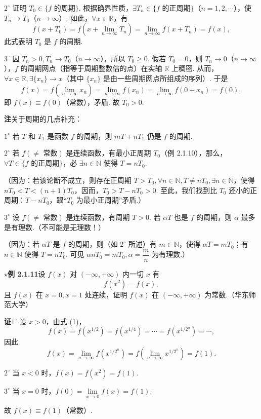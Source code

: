 \documentclass[UTF8, 12pt, fontset=fandol, oneside]{ctexart}
\begin{document}
$2^\circ$ 证明 $T_0\in\{f\text{ 的周期}\}$. 根据确界性质，$\exists T_n\in\{f\text{ 的正周期}\}$（$n=1,2,\cdots$），使 $T_n\to T_0$（$n\to\infty$）. 如此，$\forall x\in\mathbb{R}$，有
\[
  f(x+T_0)=f\left(x+\lim_{n\to\infty}T_n\right)
  =\lim_{n\to\infty}f(x+T_n)=f(x),
\]
此式表明 $T_0$ 是 $f$ 的周期.

$3^\circ$ 因 $T_n>0,T_n\to T_0$（$n\to\infty$），所以 $T_0\ge0$. 假若 $T_0=0$，则 $T_n\to0$（$n\to\infty$），$f$ 的周期网点（指等于周期整数倍的点）在实轴 $\mathbb{R}$ 上稠密. 从而，$\forall x\in\mathbb{R},\exists\{x_n\}\to x$（其中 $\{x_n\}$ 是由一些周期网点所组成的序列）. 于是
\[
  f(x)=f\left(\lim_{n\to\infty}x_n\right)=\lim_{n\to\infty}f(x_n)
  =\lim_{n\to\infty}f(0+x_n)=f(0),
\]
即 $f(x)\equiv f(0)$（常数），矛盾. 故 $T_0>0$.

\noindent\textbf{注}\quad 关于周期的几点补充：

$1^\circ$ 若 $T$ 和 $T_1$ 是函数 $f$ 的周期，则 $mT+nT_1$ 仍是 $f$ 的周期.

$2^\circ$ 若 $f(\ne\text{ 常数})$ 是连续函数，有最小正周期 $T_0$（例 2.1.10），那么，$\forall T\in\{f\text{ 的正周期}\}$，必 $\exists n\in\mathbb{N}$ 使得 $T=nT_0$.

（因为：若该论断不成立，则存在正周期 $T>T_0,\forall n\in\mathbb{N},T\ne nT_0,\exists n\in\mathbb{N}$，使得 $nT_0<T<(n+1)T_0$，因而，$T_0>T-nT_0>0$. 至此，我们找到比 $T_0$ 还小的正周期：$T-nT_0$，跟“$T_0$ 为最小正周期”矛盾.）

$3^\circ$ 设 $f(\ne\text{ 常数})$ 是连续函数，有周期 $T>0$. 若 $\alpha T$ 也是 $f$ 的周期，则 $\alpha$ 最多是有理数.（不可能是无理数！）

（因为：若 $\alpha T$ 是 $f$ 的周期，则（如 $2^\circ$ 所述）有 $m\in\mathbb{N}$，使得 $\alpha T=mT_0$；有 $n\in\mathbb{N}$ 使得 $T=nT_0$. 可见 $\alpha nT_0=mT_0,\alpha=\dfrac mn$ 为有理数.）

\noindent\textbf{$\star$例 2.1.11}\quad 设 $f(x)$ 对 $(-\infty,+\infty)$ 内一切 $x$ 有
\[
  f(x^2)=f(x),
\tag{1}
\]
且 $f(x)$ 在 $x=0,x=1$ 处连续，证明 $f(x)$ 在 $(-\infty,+\infty)$ 为常数.（华东师范大学）

\noindent\textbf{证}\quad $1^\circ$ 设 $x>0$，由式 (1)，
\[
  f(x)=f(x^{1/2})=f(x^{1/4})=\cdots=f(x^{1/2^n})=\cdots,
\]
因此
\[
  f(x)=\lim_{n\to\infty}f(x^{1/2^n})
  =f\left(\lim_{n\to\infty}x^{1/2^n}\right)=f(1).
\]

$2^\circ$ 当 $x<0$ 时，$f(x)=f(x^2)=f(1)$.

$3^\circ$ 当 $x=0$ 时，$f(0)=\lim\limits_{x\to0}f(x)=f(1)$.

故 $f(x)\equiv f(1)$（常数）.
\end{document}
